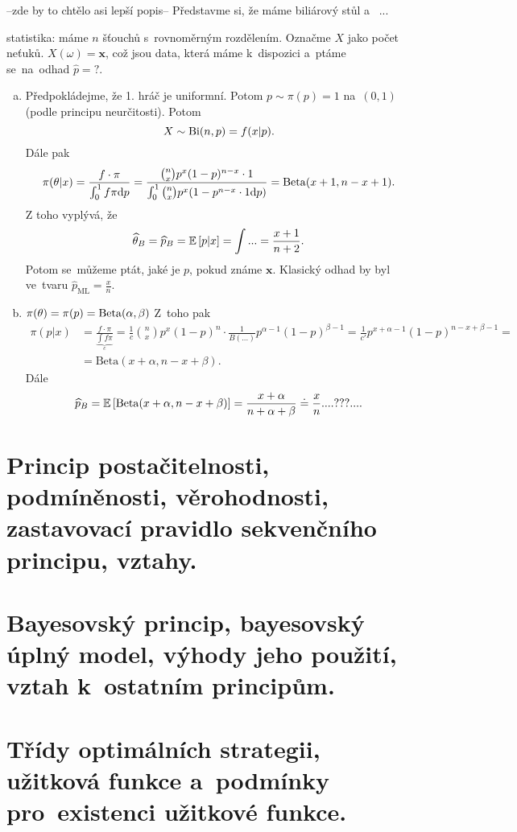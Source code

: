 \begin{example} --zde by to chtělo asi lepší popis--
	Představme si, že máme biliárový stůl a~
	...
	
	statistika: máme $n$ šťouchů s~rovnoměrným rozdělením. Označme $X$ jako počet neťuků. $X(\omega)=\textbf{x}$, což jsou data, která máme k~dispozici a~ptáme se~na~odhad $\widehat{p}=?$.\begin{enumerate}[a)]
		\item Předpokládejme, že 1. hráč je uniformní. Potom $p\sim\pi(p)=1$ na~$(0,1)$ (podle principu neurčitosti). Potom
		$$ X\sim\mathrm{Bi}(n,p)=f(x|p).$$
		Dále pak 
		$$ \pi(\theta|x)=\frac{f\cdot\pi}{\int_0^1 f\pi\mathrm{d} p}=\frac{\binom{n}{x}p^x(1-p)^{n-x}\cdot 1}{\int_0^1 \binom{n}{x}p^x(1-p^{n-x}\cdot1 \mathrm{d} p)}=\mathrm{Beta}(x+1,n-x+1).$$
		Z toho vyplývá, že
		$$ \widehat{\theta}_B=\widehat{p}_B=\mathbb{E}\left[ p|x \right]=\int...=\frac{x+1}{n+2}.$$
		Potom se~můžeme ptát, jaké je $p$, pokud známe $\textbf{x}$. Klasický odhad by byl ve~tvaru $\widehat{p}_{\mathrm{ML}}=\frac{x}{n}$.
		\item $\pi(\theta)=\pi(p)=\mathrm{Beta}(\alpha,\beta)$ Z~toho pak 
		\[
		\begin{split}
		\pi(p|x)&=\frac{f\cdot\pi}{\underbrace{\int f\pi}_c}=\frac{1}{c}\binom{n}{x}p^x(1-p)^n\cdot \frac{1}{B(...)}p^{\alpha-1}(1-p)^{\beta-1}=\frac{1}{c'}p^{x+\alpha-1}(1-p)^{n-x+\beta-1}=\\&=\mathrm{Beta}(x+\alpha,n-x+\beta).
		\end{split}
		\] 
		Dále
		$$ \widehat{p}_B=\mathbb{E}\left[ \mathrm{Beta}(x+\alpha,n-x+\beta) \right]=\frac{x+\alpha}{n+\alpha+\beta}\doteq\frac{x}{n}....???....$$
	\end{enumerate}
\end{example}

\chapter{Princip postačitelnosti, podmíněnosti, věrohodnosti, zastavovací pravidlo sekvenčního principu, vztahy.}


\chapter{Bayesovský princip, bayesovský úplný model, výhody jeho použití, vztah k~ostatním principům.}


\chapter{Třídy optimálních strategii, užitková funkce a~podmínky pro~existenci užitkové funkce.}


